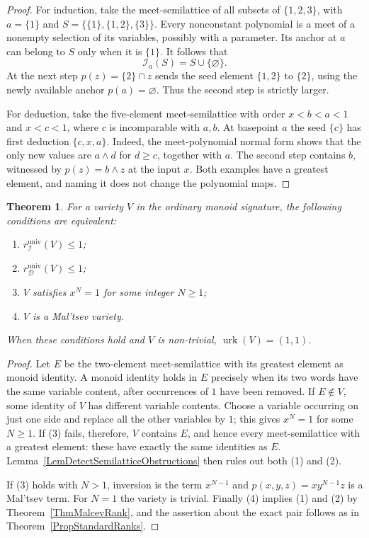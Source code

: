\documentclass[12pt,english]{amsart}
\newtheorem{theorem}{Theorem}[section]
\theoremstyle{definition}
\numberwithin{equation}{section}
\theoremstyle{remark}
\begin{document}
\begin{proof}
For induction, take the meet-semilattice of all subsets of
$\{1,2,3\}$, with $a=\{1\}$ and
$S=\{\{1\},\{1,2\},\{3\}\}$. Every nonconstant polynomial is a
meet of a nonempty selection of its variables, possibly with a
parameter. Its anchor at $a$ can belong to $S$ only when it is
$\{1\}$. It follows that
\[
\mathcal I_a(S)=S\cup\{\varnothing\}.
\]
At the next step $p(z)=\{2\}\cap z$ sends the seed element
$\{1,2\}$ to $\{2\}$, using the newly available anchor
$p(a)=\varnothing$. Thus the second step is strictly larger.

For deduction, take the five-element meet-semilattice with order
$x<b<a<1$ and $x<c<1$, where $c$ is incomparable with $a,b$.
At basepoint $a$ the seed $\{c\}$ has first deduction
$\{c,x,a\}$. Indeed, the meet-polynomial normal form shows that
the only new values are $a\wedge d$ for $d\geqslant c$, together
with $a$. The second step contains $b$, witnessed by
$p(z)=b\wedge z$ at the input $x$.
Both examples have a greatest element, and naming it does not
change the polynomial maps.
\end{proof}

\begin{theorem}\label{ThmDetectMonoidRank}
For a variety $V$ in the ordinary monoid signature, the following
conditions are equivalent:
\begin{enumerate}
\item $r_{\mathcal I}^{\mathrm{univ}}(V)\leqslant1$;
\item $r_{\mathcal D}^{\mathrm{univ}}(V)\leqslant1$;
\item $V$ satisfies $x^N=1$ for some integer $N\geqslant1$;
\item $V$ is a Mal'tsev variety.
\end{enumerate}
When these conditions hold and $V$ is non-trivial,
$\operatorname{urk}(V)=(1,1)$.
\end{theorem}

\begin{proof}
Let $E$ be the two-element meet-semilattice with its greatest element
as monoid identity. A monoid identity holds in $E$ precisely when
its two words have the same variable content, after occurrences
of $1$ have been removed. If $E\notin V$, some identity of $V$
has different variable contents. Choose a variable occurring on
just one side and replace all the other variables by $1$; this
gives $x^N=1$ for some $N\geqslant1$.
If (3) fails, therefore, $V$ contains $E$, and hence every
meet-semilattice with a greatest element: these have exactly the
same identities as $E$. Lemma~\ref{LemDetectSemilatticeObstructions}
then rules out both (1) and (2).

If (3) holds with $N>1$, inversion is the term $x^{N-1}$ and
$p(x,y,z)=xy^{N-1}z$ is a Mal'tsev term. For $N=1$ the variety is
trivial. Finally (4) implies (1) and (2) by
Theorem~\ref{ThmMalcevRank}, and the assertion about the exact
pair follows as in Theorem~\ref{PropStandardRanks}.
\end{proof}
\end{document}

